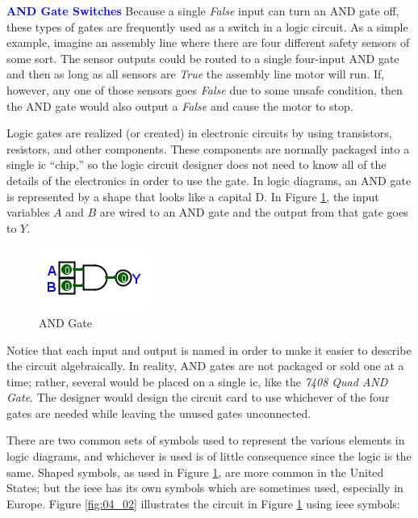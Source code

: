 \begin{tcolorbox}[colback=blue!5!white,colframe=blue!75!black]
  \textcolor{blue}{\textbf{AND Gate Switches}}
  \tcblower
  Because a single \emph{False} input can turn an \textsf{AND} gate off, these types of gates are frequently used as a switch in a logic circuit. As a simple example, imagine an assembly line where there are four different safety sensors of some sort. The sensor outputs could be routed to a single four-input \textsf{AND}  gate and then as long as all sensors are \emph{True} the assembly line motor will run. If, however, any one of those sensors goes \emph{False} due to some unsafe condition, then the \textsf{AND}  gate would also output a \emph{False} and cause the motor to stop.
\end{tcolorbox}

Logic gates are realized (or created) in electronic circuits by using transistors, resistors, and other components. These components are normally packaged into a single \gls{ic} ``chip,'' so the logic circuit designer does not need to know all of the details of the electronics in order to use the gate. In logic diagrams, an \textsf{AND}  gate is represented by a shape that looks like a capital \textsf{D}. In Figure \ref{fig:04_01}, the input variables $ A $ and $ B $ are wired to an \textsf{AND}  gate and the output from that gate goes to $ Y $.

\begin{figure}[H]
	\centering
	\includegraphics[width=\maxwidth{.95\linewidth}]{gfx/04_01}
	\caption{AND Gate}
	\label{fig:04_01}
\end{figure}

Notice that each input and output is named in order to make it easier to describe the circuit algebraically. In reality, \textsf{AND}  gates are not packaged or sold one at a time; rather, several would be placed on a single \gls{ic}, like the \emph{7408 Quad AND Gate}. The designer would design the circuit card to use whichever of the four gates are needed while leaving the unused gates unconnected. 

There are two common sets of symbols used to represent the various elements in logic diagrams, and whichever is used is of little consequence since the logic is the same. Shaped symbols, as used in Figure \ref{fig:04_01}, are more common in the United States; but the \gls{ieee} has its own symbols which are sometimes used, especially in Europe. Figure \ref{fig:04_02} illustrates the circuit in Figure \ref{fig:04_01} using \gls{ieee} symbols:

